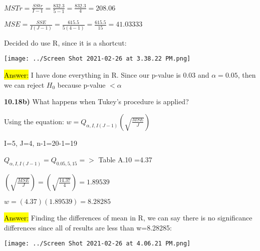 \documentclass{article}
\begin{document}
$MSTr=\frac{SStr}{I-1}=\frac{832.3}{5-1}=\frac{832.3}{4}=208.06$

\vspace{2mm}

$MSE=\frac{SSE}{I(J-1)}=\frac{615.5}{5(4-1)}=\frac{615.5}{15}=41.03333$

\vspace{2mm}

Decided do use R, since it is a shortcut:

\vspace{2mm}

\texttt{[image: ../Screen Shot 2021-02-26 at 3.38.22 PM.png]}

\vspace{2mm}

\hl{Answer:} I have done everything in R. Since our p-value is 0.03 and $\alpha=0.05$, then we can reject $H_{0}$ because p-value $< \alpha$


\vspace{5mm}

\textbf{10.18b)} What happens when Tukey’s procedure is applied?

\vspace{2mm}

Using the equation: $w=Q_{\alpha, I, I(J-1)} (\sqrt{\frac{MSE}{J}})$

\vspace{2mm}

I=5, J=4, n-1=20-1=19

\vspace{2mm}

$Q_{\alpha, I, I(J-1)}=Q_{0.05, 5, 15}=>$ Table A.10 =4.37

\vspace{2mm}

$(\sqrt{\frac{MSE}{J}})=(\sqrt{\frac{14.37}{4}})=1.89539$

\vspace{2mm}

$w=(4.37)(1.89539)=8.28285$

\vspace{2mm}

\hl{Answer:} Finding the differences of mean in R, we can say there is no significance differences since all of results are less than w=8.28285:

\vspace{2mm}


\texttt{[image: ../Screen Shot 2021-02-26 at 4.06.21 PM.png]}
\end{document}
